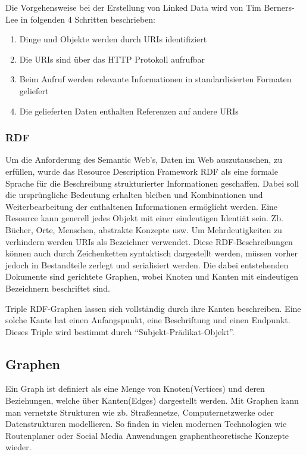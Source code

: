Die Vorgehensweise bei der Erstellung von Linked Data wird von Tim Berners-Lee in folgenden 4 Schritten beschrieben:

\begin{enumerate}
	\item Dinge und Objekte werden durch URIs identifiziert
	\item Die URIs sind über das HTTP Protokoll aufrufbar
	\item Beim Aufruf werden relevante Informationen in standardisierten Formaten geliefert
	\item Die gelieferten Daten enthalten Referenzen auf andere URIs
\end{enumerate}
\subsubsection{RDF}

Um die Anforderung des Semantic Web’s, Daten im Web auszutauschen, zu erfüllen, wurde das Resource Description Framework RDF als eine formale Sprache für die Beschreibung strukturierter Informationen geschaffen. Dabei soll die ursprüngliche Bedeutung erhalten bleiben und Kombinationen und Weiterbearbeitung der enthaltenen Informationen ermöglicht werden.
Eine Resource kann generell jedes Objekt mit einer eindeutigen Identiät sein. Zb. Bücher, Orte, Menschen, abstrakte Konzepte usw. Um Mehrdeutigkeiten zu verhindern werden URIs als Bezeichner verwendet. Diese RDF-Beschreibungen können auch durch Zeichenketten syntaktisch dargestellt werden, müssen vorher jedoch in Bestandteile zerlegt und serialisiert werden. Die dabei entstehenden Dokumente sind gerichtete Graphen, wobei Knoten und Kanten mit eindeutigen Bezeichnern beschriftet sind. 
 
Triple
RDF-Graphen lassen sich vollständig durch ihre Kanten beschreiben. Eine solche Kante hat einen Anfangspunkt, eine Beschriftung und einen Endpunkt. Dieses Triple wird bestimmt durch “Subjekt-Prädikat-Objekt”.


\subsection{Graphen}

Ein Graph ist definiert als eine Menge von Knoten(Vertices) und deren Beziehungen, welche über Kanten(Edges) dargestellt werden. Mit Graphen kann man vernetzte Strukturen wie zb. Straßennetze, Computernetzwerke oder Datenstrukturen modellieren. So finden in vielen modernen Technologien wie Routenplaner oder Social Media Anwendungen graphentheoretische Konzepte wieder.
